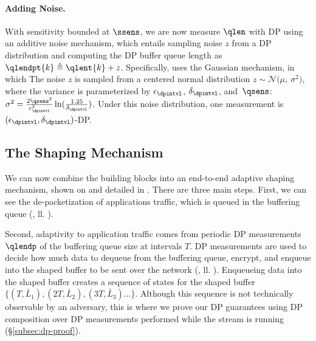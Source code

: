\paragraph{Adding Noise.}
With sensitivity bounded at $\ssens$, we are now measure $\qlen$ with DP using
an additive noise mechanism, which entails sampling noise $z$ from a DP
distribution and computing the DP buffer queue length as $\qlendpt{k} \triangleq
\qlent{k} + z$.
Specifically, {\sys} uses the Gaussian mechanism, in which
The noise $z$ is sampled from a centered normal distribution
$z \sim \mathcal{N}\big(\mu,~\sigma^2\big)$, where the variance is parameterized by
$\epsilon_\dpintvl$, $\delta_\dpintvl$, and~$\qsens$:
$\sigma^2 = \frac{2\qsens^2}{\varepsilon_\dpintvl^2}\ln(\frac{1.25}{\delta_\dpintvl})$.
Under this noise distribution, one measurement is \mbox{$(\epsilon_\dpintvl,
\delta_\dpintvl)$-DP}.


\subsection{The Shaping Mechanism}
\label{subsec:dp-queue-measurements}

We can now combine the building blocks into an end-to-end adaptive shaping
mechanism, shown on  and detailed in .
There are three main steps.
First, we can see the de-packetization of applications traffic, which is queued in the
buffering queue (, ll. ).

Second, adaptivity to application traffic comes from periodic DP measurements
$\qlendp$ of the buffering queue size at intervals $T$.
DP measurements are used to decide how much data to dequeue from the buffering
queue, encrypt, and enqueue into the shaped buffer to be sent over the network
(, ll.  ).
Enqueueing data into the shaped buffer creates a sequence of states for the
shaped buffer $\{(T, \bar{L}_1), (2T, \bar{L}_2), (3T, \bar{L}_3) \dots \}$.
Although this sequence is not technically observable by an adversary, this is
where we prove our DP guarantees using DP composition over DP measurements
performed while the stream is running (\S\ref{subsec:dp-proof}).

